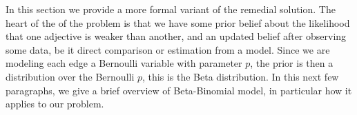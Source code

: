 In this section we provide a more formal variant of the remedial solution. The heart of the of the problem is that we have some prior belief about the likelihood that one adjective is weaker than another, and an updated belief after observing some data, be it direct comparison or estimation from a model. Since we are modeling each edge a Bernoulli variable with parameter $p$, the prior is then a distribution over the Bernoulli $p$, this is the Beta distribution. In this next few paragraphs, we give a brief overview of Beta-Binomial model, in particular how it applies to our problem.














































